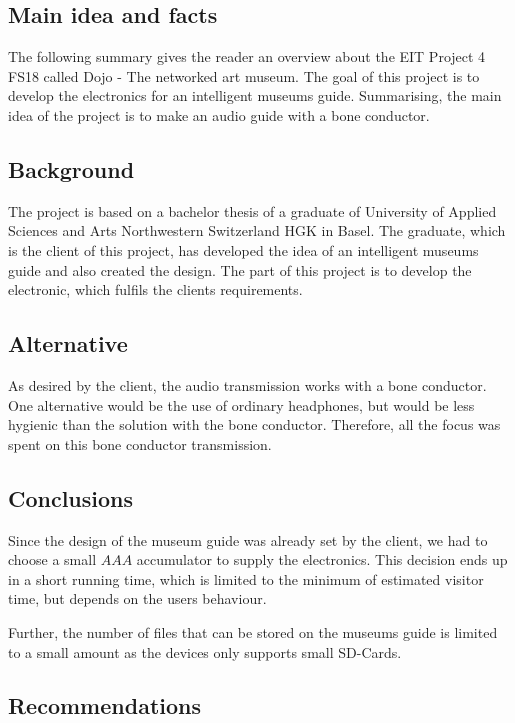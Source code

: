 \subsection*{Main idea and facts}

The following summary gives the reader an overview about the EIT Project 4 FS18 called Dojo - The networked art museum. The goal of this project is to develop the electronics for an intelligent museums guide. Summarising, the main idea of the project is to make an audio guide with a bone conductor.

\subsection*{Background}

The project is based on a bachelor thesis of a graduate of University of Applied Sciences and Arts Northwestern Switzerland HGK in Basel. The graduate, which is the client of this project, has developed the idea of an intelligent museums guide and also created the design. The part of this project is to develop the electronic, which fulfils the clients requirements.

\subsection*{Alternative}

As desired by the client, the audio transmission works with a bone conductor. One alternative would be the use of ordinary headphones, but would be less hygienic than the solution with the bone conductor. Therefore, all the focus was spent on this bone conductor transmission.

\subsection*{Conclusions}

Since the design of the museum guide was already set by the client, we had to choose a small $AAA$ accumulator to supply the electronics. This decision ends up in a short running time, which is limited to the minimum of estimated visitor time, but depends on the users behaviour.

Further, the number of files that can be stored on the museums guide is limited to a small amount as the devices only supports small SD-Cards.

\subsection*{Recommendations}

